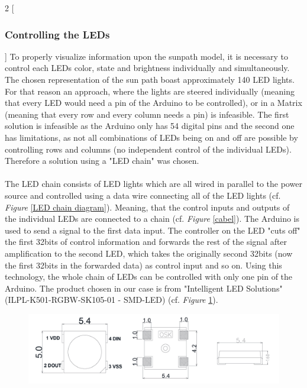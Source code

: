 \documentclass[a4paper,9pt]{article}
\begin{document}
\begin{multicols}{2}
[
 \subsubsection{Controlling the LEDs}
 ]
    To properly visualize information upon the sunpath model, it is necessary to control each LEDs color, state and brightness individually and simultaneously. The chosen representation of the sun path boast approximately 140 LED lights. For that reason an approach, where the lights are steered individually (meaning that every LED would need a pin of the Arduino to be controlled), or in a Matrix (meaning that every row and every column needs a pin) is infeasible. The first solution is infeasible as the Arduino only has 54 digital pins and the second one has limitations, as not all combinations of LEDs being on and off are possible by controlling rows and columns (no independent control of the individual LEDs). Therefore a solution using a "LED chain" was chosen.\\
    \\
    The LED chain consists of LED lights which are all wired in parallel to the power source and controlled using a data wire connecting all of the LED lights (cf. \textit{Figure} \ref{LED chain diagram}). Meaning, that the control inputs and outputs of the individual LEDs are connected to a chain (cf. \textit{Figure} \ref{cabel}). The Arduino is used to send a signal to the first data input. The controller on the LED "cuts off" the first 32bits of control information and forwards the rest of the signal after amplification to the second LED, which takes the originally second 32bits (now the first 32bits in the forwarded data) as control input and so on. Using this technology, the whole chain of LEDs can be controlled with only one pin of the Arduino. The product chosen in our case is from "Intelligent LED Solutions" (ILPL-K501-RGBW-SK105-01 - SMD-LED) (cf. \textit{Figure} \ref{LED product}).
    \columnbreak
     \begin{figure}[H]
        \centering
        \includegraphics[width=0.7\linewidth]{Images/scheme led2_1.jpg}
        \label{LED product}

\end{figure}
\end{multicols}
\end{document}
